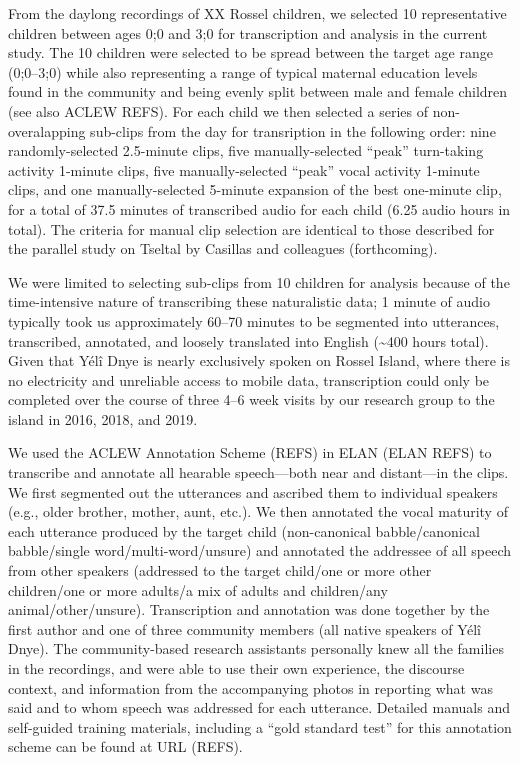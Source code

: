 \documentclass[,man,floatsintext]{apa6}
\begin{document}
From the daylong recordings of XX Rossel children, we selected 10
representative children between ages 0;0 and 3;0 for transcription and
analysis in the current study. The 10 children were selected to be
spread between the target age range (0;0--3;0) while also representing a
range of typical maternal education levels found in the community and
being evenly split between male and female children (see also ACLEW
REFS). For each child we then selected a series of non-overalapping
sub-clips from the day for transription in the following order: nine
randomly-selected 2.5-minute clips, five manually-selected
\enquote{peak} turn-taking activity 1-minute clips, five
manually-selected \enquote{peak} vocal activity 1-minute clips, and one
manually-selected 5-minute expansion of the best one-minute clip, for a
total of 37.5 minutes of transcribed audio for each child (6.25 audio
hours in total). The criteria for manual clip selection are identical to
those described for the parallel study on Tseltal by Casillas and
colleagues (forthcoming).

We were limited to selecting sub-clips from 10 children for analysis
because of the time-intensive nature of transcribing these naturalistic
data; 1 minute of audio typically took us approximately 60--70 minutes
to be segmented into utterances, transcribed, annotated, and loosely
translated into English (\textasciitilde{}400 hours total). Given that
Yélî Dnye is nearly exclusively spoken on Rossel Island, where there is
no electricity and unreliable access to mobile data, transcription could
only be completed over the course of three 4--6 week visits by our
research group to the island in 2016, 2018, and 2019.

We used the ACLEW Annotation Scheme (REFS) in ELAN (ELAN REFS) to
transcribe and annotate all hearable speech---both near and distant---in
the clips. We first segmented out the utterances and ascribed them to
individual speakers (e.g., older brother, mother, aunt, etc.). We then
annotated the vocal maturity of each utterance produced by the target
child (non-canonical babble/canonical babble/single
word/multi-word/unsure) and annotated the addressee of all speech from
other speakers (addressed to the target child/one or more other
children/one or more adults/a mix of adults and children/any
animal/other/unsure). Transcription and annotation was done together by
the first author and one of three community members (all native speakers
of Yélî Dnye). The community-based research assistants personally knew
all the families in the recordings, and were able to use their own
experience, the discourse context, and information from the accompanying
photos in reporting what was said and to whom speech was addressed for
each utterance. Detailed manuals and self-guided training materials,
including a \enquote{gold standard test} for this annotation scheme can
be found at URL (REFS).
\end{document}
